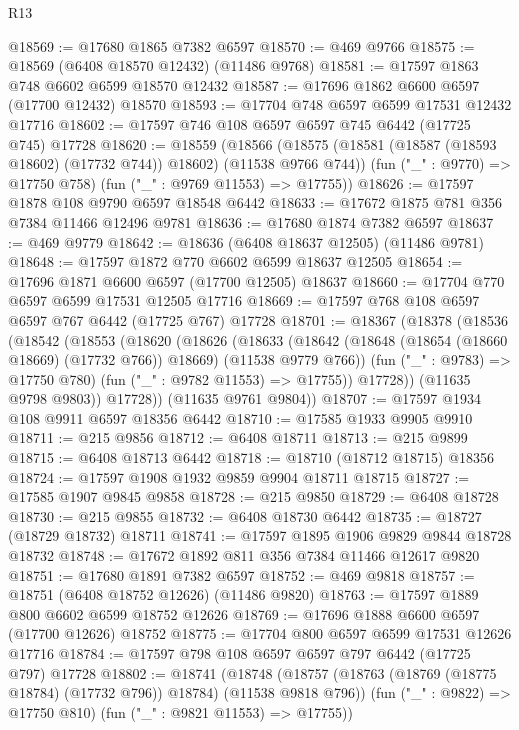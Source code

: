 \begin{lexlean}{R13}
\begin{coremodule}
@18569 := @17680 @1865 @7382 @6597
@18570 := @469 @9766
@18575 := @18569 (@6408 @18570 @12432) (@11486 @9768)
@18581 := @17597 @1863 @748 @6602 @6599 @18570 @12432
@18587 := @17696 @1862 @6600 @6597 (@17700 @12432) @18570
@18593 := @17704 @748 @6597 @6599 @17531 @12432 @17716
@18602 := @17597 @746 @108 @6597 @6597 @745 @6442 (@17725 @745) @17728
@18620 := @18559
    (@18566
      (@18575 (@18581 (@18587 (@18593 @18602) (@17732 @744)) @18602) (@11538 @9766 @744))
      (fun ("_" : @9770) => @17750 @758)
      (fun ("_" : @9769 @11553) => @17755))
@18626 := @17597 @1878 @108 @9790 @6597 @18548 @6442
@18633 := @17672 @1875 @781 @356 @7384 @11466 @12496 @9781
@18636 := @17680 @1874 @7382 @6597
@18637 := @469 @9779
@18642 := @18636 (@6408 @18637 @12505) (@11486 @9781)
@18648 := @17597 @1872 @770 @6602 @6599 @18637 @12505
@18654 := @17696 @1871 @6600 @6597 (@17700 @12505) @18637
@18660 := @17704 @770 @6597 @6599 @17531 @12505 @17716
@18669 := @17597 @768 @108 @6597 @6597 @767 @6442 (@17725 @767) @17728
@18701 := @18367
    (@18378
      (@18536
        (@18542
          (@18553
            (@18620
              (@18626
                (@18633
                  (@18642
                    (@18648 (@18654 (@18660 @18669) (@17732 @766)) @18669)
                    (@11538 @9779 @766))
                  (fun ("_" : @9783) => @17750 @780)
                  (fun ("_" : @9782 @11553) => @17755))
                @17728))
            (@11635 @9798 @9803))
          @17728))
      (@11635 @9761 @9804))
@18707 := @17597 @1934 @108 @9911 @6597 @18356 @6442
@18710 := @17585 @1933 @9905 @9910
@18711 := @215 @9856
@18712 := @6408 @18711
@18713 := @215 @9899
@18715 := @6408 @18713 @6442
@18718 := @18710 (@18712 @18715) @18356
@18724 := @17597 @1908 @1932 @9859 @9904 @18711 @18715
@18727 := @17585 @1907 @9845 @9858
@18728 := @215 @9850
@18729 := @6408 @18728
@18730 := @215 @9855
@18732 := @6408 @18730 @6442
@18735 := @18727 (@18729 @18732) @18711
@18741 := @17597 @1895 @1906 @9829 @9844 @18728 @18732
@18748 := @17672 @1892 @811 @356 @7384 @11466 @12617 @9820
@18751 := @17680 @1891 @7382 @6597
@18752 := @469 @9818
@18757 := @18751 (@6408 @18752 @12626) (@11486 @9820)
@18763 := @17597 @1889 @800 @6602 @6599 @18752 @12626
@18769 := @17696 @1888 @6600 @6597 (@17700 @12626) @18752
@18775 := @17704 @800 @6597 @6599 @17531 @12626 @17716
@18784 := @17597 @798 @108 @6597 @6597 @797 @6442 (@17725 @797) @17728
@18802 := @18741
    (@18748
      (@18757 (@18763 (@18769 (@18775 @18784) (@17732 @796)) @18784) (@11538 @9818 @796))
      (fun ("_" : @9822) => @17750 @810)
      (fun ("_" : @9821 @11553) => @17755))

\end{coremodule}
\end{lexlean}
